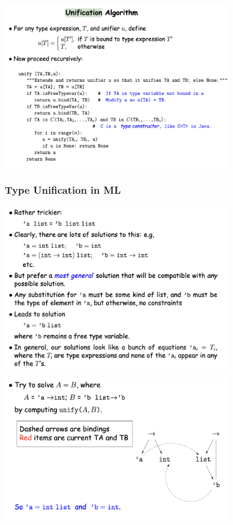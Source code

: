 \documentclass[a4paper]{exam}
\begin{document}
\begin{figure}[htbp]

  \centering
  \includegraphics[width=10cm]{img/unification.png}
  \subsubsection{Type Unification in ML}
\end{figure}

\begin{figure}[htbp]
  \centering
  \includegraphics[width=10cm]{./img/type_unification.png}
\end{figure}

\begin{figure}[htbp]
  \centering
  \includegraphics[width=10cm]{./img/type_eg.png}
\end{figure}
\end{document}
